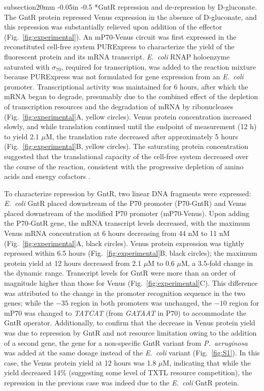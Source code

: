 \documentclass[12pt]{article}
\makeatletter
\renewcommand\subsection{\@startsection
	{subsection}{2}{0mm}
	{-0.05in}
	{-0.5\baselineskip}
	{\normalfont\normalsize\bfseries}}
\makeatother
\begin{document}
\subsection*{GntR repression and de-repression by D-gluconate.}
The GntR protein repressed Venus expression in the absence of D-gluconate, and this repression was substantially relieved upon addition of the effector (Fig.~\ref{fig:experimental}). An mP70-Venus circuit was first expressed in the reconstituted cell-free system PURExpress to characterize the yield of the fluorescent protein and its mRNA transcript. \textit{E.~coli} RNAP holoenzyme saturated with $\sigma_{70}$, required for transcription, was added to the reaction mixture because PURExpress was not formulated for gene expression from an \textit{E.~coli} promoter. Transcriptional activity was maintained for 6 hours, after which the mRNA began to degrade, presumably due to the combined effect of the depletion of transcription resources and the degradation of mRNA by ribonucleases (Fig.~\ref{fig:experimental}A, yellow circles). Venus protein concentration increased slowly, and while translation continued until the endpoint of measurement (12 h) to yield 2.1 $\mu$M, the translation rate decreased after approximately 5 hours (Fig.~\ref{fig:experimental}B, yellow circles). The saturating protein concentration suggested that the translational capacity of the cell-free system decreased over the course of the reaction, consistent with the progressive depletion of amino acids and energy cofactors \cite{stogbauer2012experiment,niederholtmeyer2013real}.

To characterize repression by GntR, two linear DNA fragments were expressed: \textit{E.~coli} GntR placed downstream of the P70 promoter (P70-GntR) and Venus placed downstream of the modified P70 promoter (mP70-Venus). Upon adding the P70-GntR gene, the mRNA transcript levels decreased, with the maximum Venus mRNA concentration at 6 hours decreasing from 44 nM to 11 nM (Fig.~\ref{fig:experimental}A, black circles). Venus protein expression was tightly repressed within 6.5 hours (Fig.~\ref{fig:experimental}B, black circles); the maximum protein yield at 12 hours decreased from 2.1 $\mu$M to 0.6 $\mu$M, a 3.5-fold change in the dynamic range. Transcript levels for GntR were more than an order of magnitude higher than those for Venus (Fig.~\ref{fig:experimental}C). This difference was attributed to the change in the promoter recognition sequence in the two genes; while the $-35$ region in both promoters was unchanged, the $-10$ region for mP70 was changed to \textit{TATCAT} (from \textit{GATAAT} in P70) to accommodate the GntR operator. Additionally, to confirm that the decrease in Venus protein yield was due to repression by GntR and not resource limitation owing to the addition of a second gene, the gene for a non-specific GntR variant from \textit{P.~aeruginosa} was added at the same dosage instead of the \textit{E.~coli} variant (Fig.~\ref{fig:S1}). In this case, the Venus protein yield at 12 hours was 1.8 $\mu$M, indicating that while the yield decreased 14\% (suggesting some level of TXTL resource competition), the repression in the previous case was indeed due to the \textit{E.~coli} GntR protein.
\end{document}
